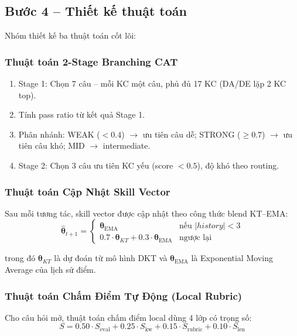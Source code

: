 \documentclass[conference]{IEEEtran}
\begin{document}
\subsection{Bước 4 -- Thiết kế thuật toán}

Nhóm thiết kế ba thuật toán cốt lõi:

\subsubsection{Thuật toán 2-Stage Branching CAT}

\begin{enumerate}[leftmargin=*,label=\arabic*.]
  \item Stage 1: Chọn 7 câu -- mỗi KC một câu, phủ đủ 17 KC (DA/DE lặp 2 KC top).
  \item Tính pass ratio từ kết quả Stage 1.
  \item Phân nhánh: WEAK ($< 0.4$) $\to$ ưu tiên câu dễ; STRONG ($\geq 0.7$) $\to$ ưu tiên câu khó; MID $\to$ intermediate.
  \item Stage 2: Chọn 3 câu ưu tiên KC yếu (score $< 0.5$), độ khó theo routing.
\end{enumerate}

\subsubsection{Thuật toán Cập Nhật Skill Vector}

Sau mỗi tương tác, skill vector được cập nhật theo công thức blend KT--EMA:
\begin{equation}
  \hat{\bm{\theta}}_{t+1} =
  \begin{cases}
    \bm{\theta}_{\text{EMA}} & \text{nếu } |history| < 3 \\
    0.7 \cdot \bm{\theta}_{KT} + 0.3 \cdot \bm{\theta}_{\text{EMA}} & \text{ngược lại}
  \end{cases}
  \label{eq:blend}
\end{equation}

trong đó $\bm{\theta}_{KT}$ là dự đoán từ mô hình DKT và $\bm{\theta}_{\text{EMA}}$ là Exponential Moving Average của lịch sử điểm.

\subsubsection{Thuật toán Chấm Điểm Tự Động (Local Rubric)}

Cho câu hỏi mở, thuật toán chấm điểm local dùng 4 lớp có trọng số:
\begin{equation}
  S = 0.50 \cdot S_{\text{eval}} + 0.25 \cdot S_{\text{kw}} + 0.15 \cdot S_{\text{rubric}} + 0.10 \cdot S_{\text{len}}
\end{equation}
\end{document}
